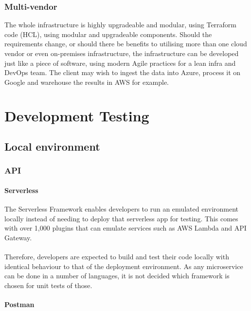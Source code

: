 \documentclass[10pt]{article}
\begin{document}
\subsubsection{Multi-vendor}
The whole infrastructure is highly upgradeable and modular, using Terraform code (HCL), using modular and upgradeable components. Should the requirements change, or should there be benefits to utilising more than one cloud vendor or even on-premises infrastructure, the infrastructure can be developed just like a piece of software, using modern Agile practices for a lean infra and DevOps team. The client may wish to ingest the data into Azure, process it on Google and warehouse the results in AWS for example.

\newpage
\section{Development Testing}
\subsection{Local environment}

\subsubsection{API}
\paragraph{Serverless}
The Serverless Framework enables developers to run an emulated environment locally instead of needing to deploy that serverless app for testing. This comes with over 1,000 plugins that can emulate services such as AWS Lambda and API Gateway. 
\\ \\
Therefore, developers are expected to build and test their code locally with identical behaviour to that of the deployment environment. As any microservice can be done in a number of languages, it is not decided which framework is chosen for unit tests of those.
\paragraph{Postman}
\end{document}
